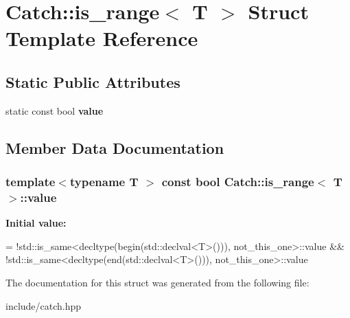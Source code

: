 \hypertarget{structCatch_1_1is__range}{}\section{Catch\+:\+:is\+\_\+range$<$ T $>$ Struct Template Reference}
\label{structCatch_1_1is__range}
\subsection*{Static Public Attributes}
\begin{DoxyCompactItemize}
\item 
static const bool {\bfseries value}
\end{DoxyCompactItemize}


\subsection{Member Data Documentation}
\subsubsection[{\texorpdfstring{value}{value}}]{\setlength{\rightskip}{0pt plus 5cm}template$<$typename T $>$ const bool {\bf Catch\+::is\+\_\+range}$<$ T $>$\+::value\hspace{0.3cm}{\ttfamily [static]}}\hypertarget{structCatch_1_1is__range_afaec39e819c3956829cbbd00feba11be}{}\label{structCatch_1_1is__range_afaec39e819c3956829cbbd00feba11be}
{\bfseries Initial value\+:}
\begin{DoxyCode}
=
            !std::is\_same<decltype(begin(std::declval<T>())), not\_this\_one>::value &&
            !std::is\_same<decltype(end(std::declval<T>())), not\_this\_one>::value
\end{DoxyCode}


The documentation for this struct was generated from the following file\+:\begin{DoxyCompactItemize}
\item 
include/catch.\+hpp\end{DoxyCompactItemize}
